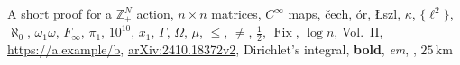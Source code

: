 A short proof for a $\mathbb Z_+^N$ action, $n\times n$ matrices, $C^\infty$ maps,
\v{c}ech, \'{o}r, \L{}szl, $\kappa$, $\{\ell^2\}$, $\aleph_0$, $\omega_1\omega$,
$F_\infty$, $\pi_1$, $10^{10}$, $x_1$, $\Gamma$, $\Omega$, $\mu$, $\le$, $\ne$,
$\frac{1}{2}$, $\operatorname{Fix}$, $\log n$, Vol.~II, \url{https://a.example/b},
\href{https://a.example/b}{arXiv:2410.18372v2}, {Dirichlet}'s integral,
\textbf{bold}, \emph{em}, \allowbreak, $25\,\mathrm{km}$
